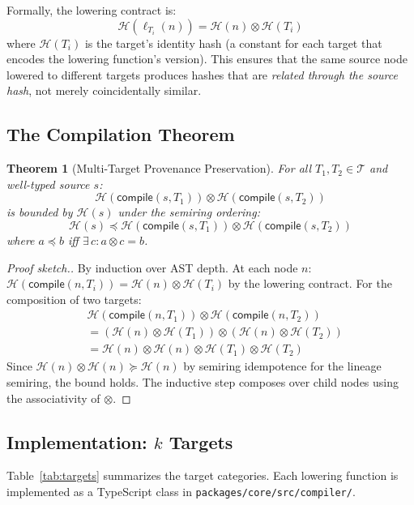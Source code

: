 \documentclass[sigconf,nonacm]{acmart}
\newcommand{\hashfn}{\mathcal{H}}
\newcommand{\tropmult}{\otimes}
\newcommand{\compilefn}{\mathsf{compile}}
\newtheorem{theorem}{Theorem}
\begin{document}
Formally, the lowering contract is:
$$\hashfn(\ell_{T_i}(n)) = \hashfn(n) \tropmult \hashfn(T_i)$$
where $\hashfn(T_i)$ is the target's identity hash (a constant
for each target that encodes the lowering function's version).
This ensures that the same source node lowered to different
targets produces hashes that are \emph{related through the
source hash}, not merely coincidentally similar.

\subsection{The Compilation Theorem}
\begin{theorem}[Multi-Target Provenance Preservation]
\label{thm:multitarget}
For all $T_1, T_2 \in \mathcal{T}$ and well-typed source $s$:
$$\hashfn(\compilefn(s, T_1)) \tropmult
  \hashfn(\compilefn(s, T_2))$$
is bounded by $\hashfn(s)$ under the semiring ordering:
$$\hashfn(s) \preceq
  \hashfn(\compilefn(s, T_1)) \tropmult
  \hashfn(\compilefn(s, T_2))$$
where $a \preceq b$ iff $\exists\, c: a \tropmult c = b$.
\end{theorem}

\begin{proof}[Proof sketch.]
By induction over AST depth. At each node $n$:
$\hashfn(\compilefn(n, T_i)) = \hashfn(n) \tropmult \hashfn(T_i)$
by the lowering contract. For the composition of two targets:
\begin{align*}
  &\hashfn(\compilefn(n, T_1)) \tropmult
   \hashfn(\compilefn(n, T_2)) \\
  &= (\hashfn(n) \tropmult \hashfn(T_1)) \tropmult
     (\hashfn(n) \tropmult \hashfn(T_2)) \\
  &= \hashfn(n) \tropmult \hashfn(n) \tropmult
     \hashfn(T_1) \tropmult \hashfn(T_2)
\end{align*}
Since $\hashfn(n) \tropmult \hashfn(n) \succeq \hashfn(n)$ by
semiring idempotence for the lineage semiring, the bound holds.
The inductive step composes over child nodes using the
associativity of $\tropmult$.
\end{proof}

\subsection{Implementation: $k$ Targets}

Table~\ref{tab:targets} summarizes the target categories.
Each lowering function is implemented as a TypeScript class
in \texttt{packages/core/src/compiler/}.
\end{document}
